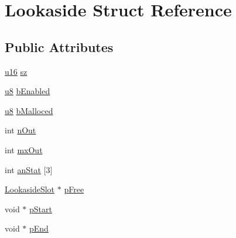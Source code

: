 \hypertarget{struct_lookaside}{\section{Lookaside Struct Reference}
\label{struct_lookaside}
}
\subsection*{Public Attributes}
\begin{DoxyCompactItemize}
\item 
\hyperlink{sqlite3_8c_a20f2299e322dcbde37cb07b16910b843}{u16} \hyperlink{struct_lookaside_a2e8346b6cebbb64d9a6886a19ef843a1}{sz}
\item 
\hyperlink{sqlite3_8c_a74a0f6424ae628af25f23f0a35f6ead3}{u8} \hyperlink{struct_lookaside_adbe2c3486f893c30525e19388f35eb21}{b\-Enabled}
\item 
\hyperlink{sqlite3_8c_a74a0f6424ae628af25f23f0a35f6ead3}{u8} \hyperlink{struct_lookaside_a218f14cf9eb2c430867d286e9ac57ac5}{b\-Malloced}
\item 
int \hyperlink{struct_lookaside_a4cdd49fa554f877928d5bb31d55b32e9}{n\-Out}
\item 
int \hyperlink{struct_lookaside_a2ce364d95b55913df986999de442e4f9}{mx\-Out}
\item 
int \hyperlink{struct_lookaside_a7d875204cb05a327bb1652139faa4374}{an\-Stat} \mbox{[}3\mbox{]}
\item 
\hyperlink{struct_lookaside_slot}{Lookaside\-Slot} $\ast$ \hyperlink{struct_lookaside_a318d2faa7f976f9d1b3c6e08bdc1d992}{p\-Free}
\item 
void $\ast$ \hyperlink{struct_lookaside_a47073fcdffdc5a7a1464f0d09bfc17f9}{p\-Start}
\item 
void $\ast$ \hyperlink{struct_lookaside_ad3555c5558e104f2b82f62bf642cf831}{p\-End}
\end{DoxyCompactItemize}


